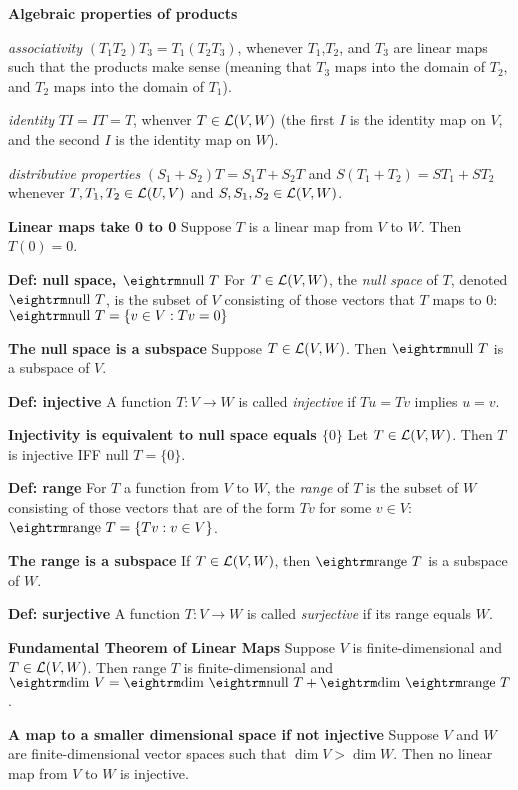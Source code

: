 {{\bf Algebraic properties of products }\par
{\it associativity} $(T_1T_2)T_3 = T_1(T_2T_3)$, whenever $T_1$,$T_2$, and $T_3$ are linear maps such that the products make sense (meaning that $T_3$ maps into the domain of $T_2$, and $T_2$ maps into the domain of $T_1$).\par
{\it identity} $TI = IT = T$, whenver $T \in {\cal L}(V,W)$ (the first $I$ is the identity map on $V$, and the second $I$ is the identity map on $W$).\par
{\it distributive properties} $(S_1+S_2)T = S_1T + S_2T$ and $S(T_1+T_2) = ST_1 + ST_2$ whenever $T,T_1,T_2 \in {\cal L}(U,V)$ and $S, S_1, S_2 \in {\cal L}(V,W)$.

{\bf Linear maps take 0 to 0} Suppose $T$ is a linear map from $V$ to $W$. Then $T(0) = 0$.

{\bf Def: null space, ${\rm null}\ T$}
For $T \in {\cal L}(V,W)$, the {\it null space} of $T$, denoted ${\rm null}\ T$, is the subset of $V$ consisting of those vectors that $T$ maps to 0: ${\rm null}\ T = \{v \in V : Tv = 0\}$

{\bf The null space is a subspace}
Suppose $T \in {\cal L}(V,W)$. Then ${\rm null}\ T$ is a subspace of $V$.

{\bf Def: injective}
A function $T:V \rightarrow W$ is called {\it injective} if $Tu = Tv$ implies $u = v$.

{\bf Injectivity is equivalent to null space equals $\{0\}$}
Let $T \in {\cal L}(V,W)$. Then $T$ is injective IFF null $T = \{0\}$.

{\bf Def: range}
For $T$ a function from $V$ to $W$, the {\it range} of $T$ is the subset of $W$ consisting of those vectors that are of the form $Tv$ for some $v \in V$: ${\rm range}\ T = \{Tv : v \in V\}$.

{\bf The range is a subspace}
If $T \in {\cal L}(V,W)$, then ${\rm range}\ T$ is a subspace of $W$.

{\bf Def: surjective}
A function $T : V \rightarrow W$ is called {\it surjective} if its range equals $W$.

{\bf Fundamental Theorem of Linear Maps}
Suppose $V$ is finite-dimensional and $T \in {\cal L}(V,W)$. Then range $T$ is finite-dimensional and $\dim V = \dim {\rm null}\ T + \dim {\rm range}\ T$.

{\bf A map to a smaller dimensional space if not injective}
Suppose $V$ and $W$ are finite-dimensional vector spaces such that $\dim V > \dim W$. Then no linear map from $V$ to $W$ is injective.

}
